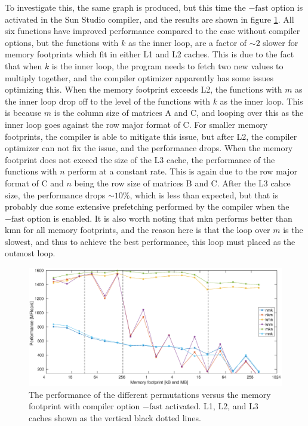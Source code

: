 To investigate this, the same graph is produced, but this time the $\mathrm{-fast}$ option is activated in the Sun Studio compiler, and the results are shown in figure \ref{fig:permGraph_fast}. All six functions have improved performance compared to the case without compiler options, but the functions with $k$ as the inner loop, are a factor of $\sim 2$  slower for memory footprints which fit in either L1 and L2 caches. This is due to the fact that when $k$ is the inner loop, the program needs to fetch two new values to multiply together, and the compiler optimizer apparently has some issues optimizing this. When the memory footprint exceeds L2, the functions with $m$ as the inner loop drop off to the level of the functions with $k$ as the inner loop. This is because $m$ is the column size of matrices A and C, and looping over this as the inner loop goes against the row major format of C. For smaller memory footprints, the compiler is able to mitigate this issue, but after L2, the compiler optimizer can not fix the issue, and the performance drops. When the memory footprint does not exceed the size of the L3 cache, the performance of the functions with $n$ perform at a constant rate. This is again due to the row major format of C and $n$ being the row size of matrices B and C. After the L3 cahce size, the performance drops $\sim 10 \%$, which is less than expected, but that is probably due some extensive prefetching performed by the compiler when the $\mathrm{-fast}$ option is enabled. It is also worth noting that mkn performs better than kmn for all memory footprints, and the reason here is that the loop over $m$ is the slowest, and thus to achieve the best performance, this loop must placed as the outmost loop.

\begin{figure}
\centering
\includegraphics[width = 1.1\textwidth]{fig/permGraph_fast.eps}
\caption{The performance of the different permutations versus the memory footprint with compiler option $\mathrm{-fast}$ activated. L1, L2, and L3 caches shown as the vertical black dotted lines.}
\label{fig:permGraph_fast}
\end{figure}

